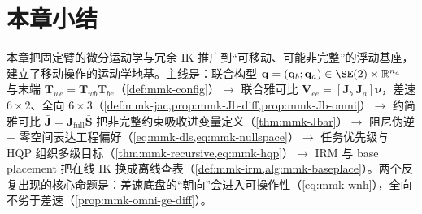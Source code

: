 \section*{本章小结}

本章把固定臂的微分运动学与冗余 IK 推广到“可移动、可能非完整”的浮动基座，建立了移动操作的运动学地基。主线是：联合构型 $\mathbf{q}=(\mathbf{q}_b;\mathbf{q}_a)\in\SE(2)\times\mathbb{R}^{n_a}$ 与末端 $\mathbf{T}_{we}=\mathbf{T}_{wb}\mathbf{T}_{be}$（\cref{def:mmk-config}）$\to$ 联合雅可比 $\mathbf{V}_{ee}=[\mathbf{J}_b\ \mathbf{J}_a]\boldsymbol{\nu}$，差速 $6\times2$、全向 $6\times3$（\cref{def:mmk-jac,prop:mmk-Jb-diff,prop:mmk-Jb-omni}）$\to$ 约简雅可比 $\bar{\mathbf{J}}=\mathbf{J}_{\text{full}}\bar{\mathbf{S}}$ 把非完整约束吸收进变量定义（\cref{thm:mmk-Jbar}）$\to$ 阻尼伪逆 $+$ 零空间表达工程偏好（\cref{eq:mmk-dls,eq:mmk-nullspace}）$\to$ 任务优先级与 HQP 组织多级目标（\cref{thm:mmk-recursive,eq:mmk-hqp}）$\to$ IRM 与 base placement 把在线 IK 换成离线查表（\cref{def:mmk-irm,alg:mmk-baseplace}）。两个反复出现的核心命题是：差速底盘的“朝向”会进入可操作性（\cref{eq:mmk-wnh}），全向不劣于差速（\cref{prop:mmk-omni-ge-diff}）。

